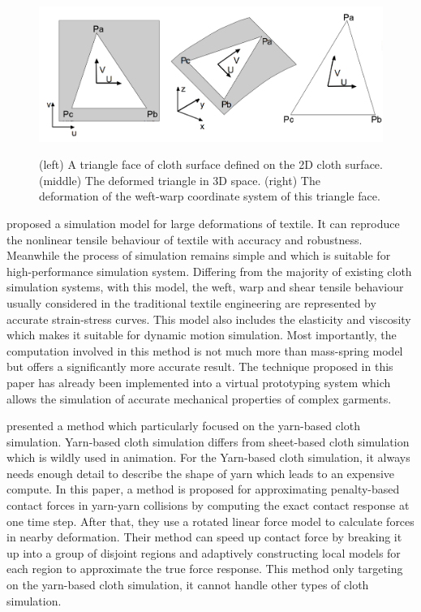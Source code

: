 \begin{figure}[ht]
    \centering
	\includegraphics[width=0.7\columnwidth]{../images/Volino2005}\\[1cm]
    \caption{(left) A triangle face of cloth surface defined on the 2D cloth surface. (middle) The deformed triangle in 3D space. (right) The deformation of the weft-warp coordinate system of this triangle face.}
    \label{figure:Volino2005}
\end{figure}


\cite{Volino2009} proposed a simulation model for large deformations of textile. It can reproduce the nonlinear tensile behaviour of textile with accuracy and robustness. Meanwhile the process of simulation remains simple and which is suitable for high-performance simulation system. Differing from the majority of existing cloth simulation systems, with this model, the weft, warp and shear tensile behaviour usually considered in the traditional textile engineering are represented by accurate strain-stress curves.  This model also includes the elasticity and viscosity which makes it suitable for dynamic motion simulation. Most importantly, the computation involved in this method is not much more than mass-spring model but offers a significantly more accurate result.
The technique proposed in this paper has already been implemented into a virtual prototyping system which allows the simulation of accurate mechanical properties of complex garments. 


\cite{Kaldor2010} presented a method which particularly focused on the yarn-based cloth simulation. Yarn-based cloth simulation differs from sheet-based cloth simulation which is wildly used in animation. For the Yarn-based cloth simulation, it always needs enough detail to describe the shape of yarn which leads to an expensive compute. In this paper, a method is proposed for approximating penalty-based contact forces in yarn-yarn collisions by computing the exact contact response at one time step. After that, they use a rotated linear force model to calculate forces in nearby deformation. Their method can speed up contact force by breaking it up into a group of disjoint regions and adaptively constructing local models for each region to approximate the true force response. This method only targeting on the yarn-based cloth simulation, it cannot handle other types of cloth simulation.


